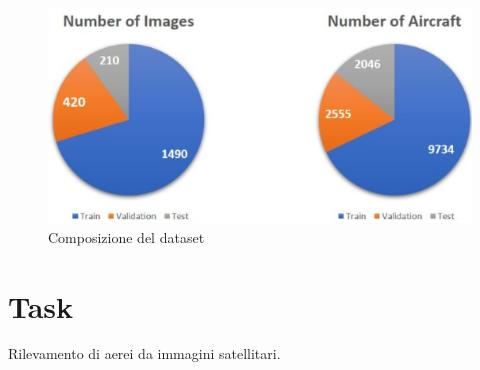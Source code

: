 \documentclass[a4paper, 12pt]{report}
\begin{document}
\begin{figure}
   \centering
   \includegraphics[keepaspectratio=true,scale=0.6]{./dataset_info.png}
    \caption{Composizione del dataset}
    \label{fig:dataset_info}
\end{figure}



\section*{Task}

Rilevamento di aerei da immagini satellitari.
\end{document}
